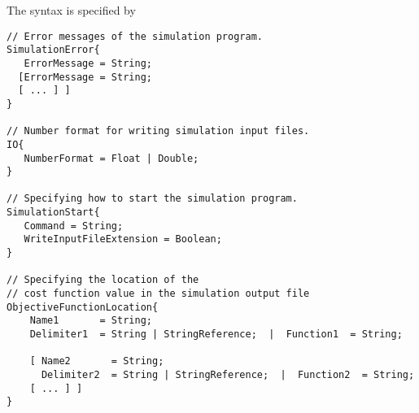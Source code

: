 \pagebreak[4]
\noindent The syntax is specified by
\begin{lstlisting}
// Error messages of the simulation program.
SimulationError{
   ErrorMessage = String;
  [ErrorMessage = String;
  [ ... ] ]
}

// Number format for writing simulation input files.
IO{
   NumberFormat = Float | Double;
}

// Specifying how to start the simulation program.
SimulationStart{
   Command = String; 
   WriteInputFileExtension = Boolean;
}

// Specifying the location of the
// cost function value in the simulation output file
ObjectiveFunctionLocation{
    Name1       = String;
    Delimiter1  = String | StringReference;  |  Function1  = String;

    [ Name2       = String;
      Delimiter2  = String | StringReference;  |  Function2  = String;
    [ ... ] ]
}
\end{lstlisting}


